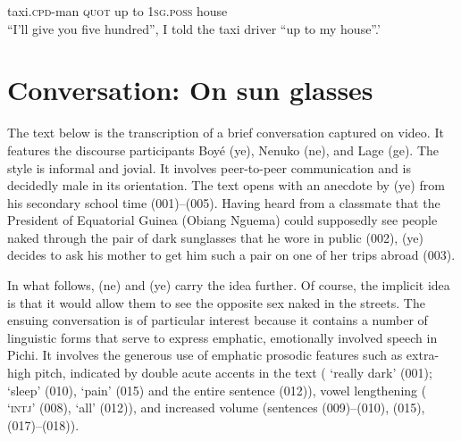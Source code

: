 {taxi.\textsc{cpd}{}-man  \textsc{quot}     up        to  \textsc{1sg.poss}  house    \\
 “I’ll give you five hundred”, I told the taxi driver “up to my house”.’
  }\z
\section{Conversation: On sun glasses}

The text below is the transcription of a brief conversation captured on video. It features the discourse participants Boyé (ye), Nenuko (ne), and Lage (ge). The style is informal and jovial. It involves peer-to-peer communication and is decidedly male in its orientation. The text opens with an anecdote by (ye) from his secondary school time (001)–(005). Having heard from a classmate that the President of Equatorial Guinea (Obiang Nguema) could supposedly see people naked through the pair of dark sunglasses that he wore in public (002), (ye) decides to ask his mother to get him such a pair on one of her trips abroad (003). 


In what follows, (ne) and (ye) carry the idea further. Of course, the implicit idea is that it would allow them to see the opposite sex naked in the streets. The ensuing conversation is of particular interest because it contains a number of linguistic forms that serve to express emphatic, emotionally involved speech in Pichi. It involves the generous use of emphatic prosodic features such as extra-high pitch, indicated by double acute accents in the text ( ‘really dark’ (001);  ‘sleep’ (010),  ‘pain’ (015) and the entire sentence (012)), vowel lengthening ( ‘\textsc{intj}’ (008),  ‘all’ (012)), and increased volume (sentences (009)–(010), (015), (017)–(018)). 



